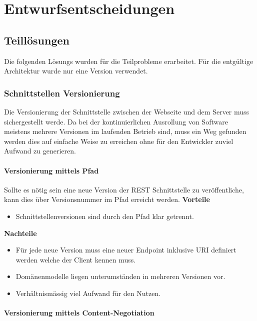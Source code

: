 \chapter{Entwurfsentscheidungen}

\section{Teillösungen}

Die folgenden Lösungs wurden für die Teilprobleme erarbeitet. Für die entgültige Architektur wurde nur eine Version verwendet.

\subsection{Schnittstellen Versionierung}

Die Versionierung der Schnittstelle zwischen der Webseite und dem Server muss sichergestellt werde. Da bei der kontinuierlichen Ausrollung von Software meistens mehrere Versionen im laufenden Betrieb sind, muss ein Weg gefunden werden dies auf einfache Weise zu erreichen ohne für den Entwickler zuviel Aufwand zu generieren.

\subsubsection{Versionierung mittels Pfad}

Sollte es nötig sein eine neue Version der REST Schnittstelle zu veröffentliche, kann dies über Versionsnummer im Pfad erreicht werden. 
\newline
\newline
\textbf{Vorteile}
\begin{itemize}
	\item Schnittstellenversionen sind durch den Pfad klar getrennt.
\end{itemize}
\textbf{Nachteile}
\begin{itemize}
	\item Für jede neue Version muss eine neuer Endpoint inklusive URI definiert werden welche der Client kennen muss.
	\item Domänenmodelle liegen unterumständen in mehreren Versionen vor.
	\item Verhältnismässig viel Aufwand für den Nutzen.
\end{itemize}

\subsubsection{Versionierung mittels Content-Negotiation}

